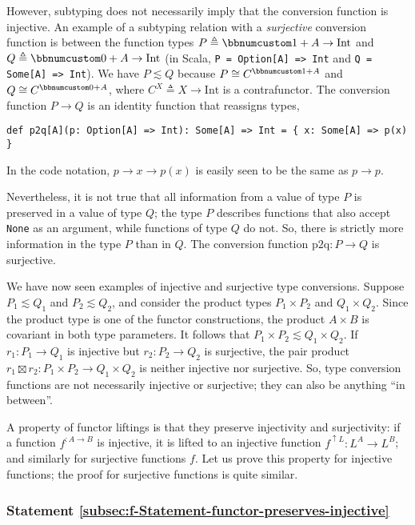 However, subtyping does not necessarily imply that the conversion
function is injective. An example of a subtyping relation with a \emph{surjective}
conversion function is between the function types $P\triangleq\bbnum 1+A\rightarrow\text{Int}$
and $Q\triangleq\bbnum 0+A\rightarrow\text{Int}$ (in Scala, \lstinline!P = Option[A] => Int!
and \lstinline!Q = Some[A] => Int!). We have $P\lesssim Q$ because
$P\cong C^{\bbnum 1+A}$ and $Q\cong C^{\bbnum 0+A}$, where $C^{X}\triangleq X\rightarrow\text{Int}$
is a contrafunctor. The conversion function $P\rightarrow Q$ is an
identity function that reassigns types,
\begin{lstlisting}
def p2q[A](p: Option[A] => Int): Some[A] => Int = { x: Some[A] => p(x) }
\end{lstlisting}
In the code notation, $p\rightarrow x\rightarrow p(x)$ is easily
seen to be the same as $p\rightarrow p$. 

Nevertheless, it is not true that all information from a value of
type $P$ is preserved in a value of type $Q$; the type $P$ describes
functions that also accept \lstinline!None! as an argument, while
functions of type $Q$ do not. So, there is strictly more information
in the type $P$ than in $Q$. The conversion function $\text{p2q}:P\rightarrow Q$
is surjective.

We have now seen examples of injective and surjective type conversions.
Suppose $P_{1}\lesssim Q_{1}$ and $P_{2}\lesssim Q_{2}$, and consider
the product types $P_{1}\times P_{2}$ and $Q_{1}\times Q_{2}$. Since
the product type is one of the functor constructions, the product
$A\times B$ is covariant in both type parameters. It follows that
$P_{1}\times P_{2}\lesssim Q_{1}\times Q_{2}$. If $r_{1}:P_{1}\rightarrow Q_{1}$
is injective but $r_{2}:P_{2}\rightarrow Q_{2}$ is surjective, the
pair product $r_{1}\boxtimes r_{2}:P_{1}\times P_{2}\rightarrow Q_{1}\times Q_{2}$
is neither injective nor surjective. So, type conversion functions
are not necessarily injective or surjective; they can also be anything
\textsf{``}in between\textsf{''}.

A property of functor liftings is that they preserve injectivity and
surjectivity: if a function $f^{:A\rightarrow B}$ is injective, it
is lifted to an injective function $f^{\uparrow L}:L^{A}\rightarrow L^{B}$;
and similarly for surjective functions $f$. Let us prove this property
for injective functions; the proof for surjective functions is quite
similar.

\subsubsection{Statement \label{subsec:f-Statement-functor-preserves-injective}\ref{subsec:f-Statement-functor-preserves-injective}}

